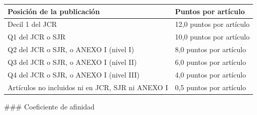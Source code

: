 \documentclass{article}
\begin{document}
\begin{itemize}
\begin{itemize}
                \vspace{0.4cm}
                \begin{table}[h!]\centering\renewcommand{\arraystretch}{1.3}
                  \begin{tabular}{|p{}|p{}|}\hline
                    Posición de la publicación                       & Puntos por artículo      \\\hline
                    Decil 1 del JCR                                  & 12,0 puntos por artículo \\\hline
                    Q1 del JCR o SJR                                 & 10,0 puntos por artículo \\\hline
                    Q2 del JCR o SJR, o ANEXO I (nivel I)            & 8,0 puntos por artículo  \\\hline
                    Q3 del JCR o SJR, o ANEXO I (nivel II)           & 6,0 puntos por artículo  \\\hline
                    Q4 del JCR o SJR, o ANEXO I (nivel III)          & 4,0 puntos por artículo  \\\hline
                    Artículos no incluidos ni en JCR, SJR ni ANEXO I & 0,5 puntos por artículo  \\\hline
                  \end{tabular}\end{table}
                \vspace{0.4cm}

                \#\#\# Coeficiente de afinidad


\end{itemize}
\end{itemize}
\end{document}
